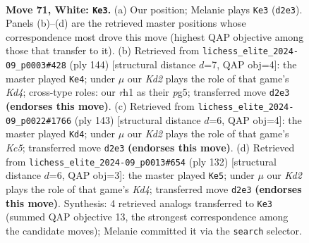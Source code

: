 \documentclass[11pt]{article}
\begin{document}
\clearpage

\begin{figure}[p]\centering
\begin{subfigure}{0.46\textwidth}\centering
\resizebox{\linewidth}{!}{%
\newchessgame
\chessboard[
  setfen={8/8/8/1k6/8/R2N4/3K2P1/7r w - - 6 71},
  showmover=false,
  pgfstyle=straightmove, color=movearrow, markmove={d2-e3}
]}
\caption{}
\end{subfigure}\hfill
\begin{subfigure}{0.46\textwidth}\centering
\resizebox{\linewidth}{!}{%
\newchessgame
\chessboard[
  setfen={8/8/8/6p1/3K4/4NR2/7k/8 w - - 0 73},
  showmover=false,
  pgfstyle=straightmove, color=movearrow, markmove={d4-e4}
]}
\caption{}
\end{subfigure}
\\[4pt]
\begin{subfigure}{0.46\textwidth}\centering
\resizebox{\linewidth}{!}{%
\newchessgame
\chessboard[
  setfen={8/5r2/8/2n5/2k3K1/4R3/8/8 b - - 33 72},
  showmover=false,
  pgfstyle=straightmove, color=movearrow, markmove={c4-d4}
]}
\caption{}
\end{subfigure}\hfill
\begin{subfigure}{0.46\textwidth}\centering
\resizebox{\linewidth}{!}{%
\newchessgame
\chessboard[
  setfen={4k3/R7/8/8/3K4/4N3/8/2r5 w - - 7 67},
  showmover=false,
  pgfstyle=straightmove, color=movearrow, markmove={d4-e5}
]}
\caption{}
\end{subfigure}
\caption{\textbf{Move 71, White: \texttt{Ke3}.} (a) Our position; Melanie plays \texttt{Ke3} (\texttt{d2e3}). Panels (b)--(d) are the retrieved master positions whose correspondence most drove this move (highest QAP objective among those that transfer to it). (b) Retrieved from \texttt{lichess\_elite\_2024-09\_p0003\#428} (ply 144) [structural distance $d$=7, QAP obj=4]: the master played \texttt{Ke4}; under $\mu$ our \emph{Kd2} plays the role of that game's \emph{Kd4}; cross-type roles: our \emph{r}h1 as their \emph{p}g5; transferred move \texttt{d2e3} \textbf{(endorses this move)}. (c) Retrieved from \texttt{lichess\_elite\_2024-09\_p0022\#1766} (ply 143) [structural distance $d$=6, QAP obj=4]: the master played \texttt{Kd4}; under $\mu$ our \emph{Kd2} plays the role of that game's \emph{Kc5}; transferred move \texttt{d2e3} \textbf{(endorses this move)}. (d) Retrieved from \texttt{lichess\_elite\_2024-09\_p0013\#654} (ply 132) [structural distance $d$=6, QAP obj=3]: the master played \texttt{Ke5}; under $\mu$ our \emph{Kd2} plays the role of that game's \emph{Kd4}; transferred move \texttt{d2e3} \textbf{(endorses this move)}. Synthesis: 4 retrieved analogs transferred to \texttt{Ke3} (summed QAP objective 13, the strongest correspondence among the candidate moves); Melanie committed it via the \texttt{search} selector.}
\label{fig:thought-m140}
\end{figure}
\end{document}
